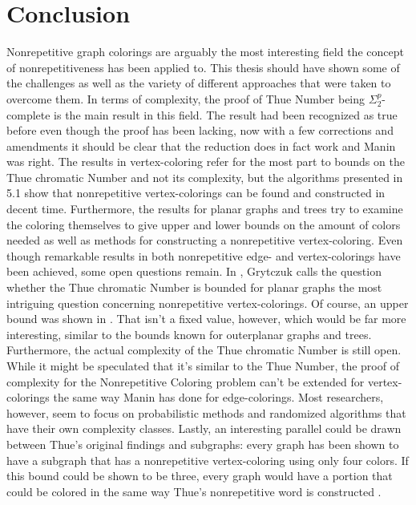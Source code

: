 \documentclass[12pt,a4paper]{article}
\begin{document}
\newpage
\section{Conclusion}
Nonrepetitive graph colorings are arguably the most interesting field the concept of nonrepetitiveness has been applied to. This thesis should have shown some of the challenges as well as the variety of different approaches that were taken to overcome them. 
\newline 
In terms of complexity, the proof of Thue Number being $\Sigma^p_2$-complete is the main result in this field. The result had been recognized as true before even though the proof has been lacking, now with a few corrections and amendments it should be clear that the reduction does in fact work and Manin was right. The results in vertex-coloring refer for the most part to bounds on the Thue chromatic Number and not its complexity, but the algorithms presented in 5.1 show that nonrepetitive vertex-colorings can be found and constructed in decent time. Furthermore, the results for planar graphs and trees try to examine the coloring themselves to give upper and lower bounds on the amount of colors needed as well as methods for constructing a nonrepetitive vertex-coloring.
\newline
Even though remarkable results in both nonrepetitive edge- and vertex-colorings have been achieved, some open questions remain.
\newline
In \citep{Grytczuk2007}, Grytczuk calls the question whether the Thue chromatic Number is bounded for planar graphs the most intriguing question concerning nonrepetitive vertex-colorings. Of course, an upper bound was shown in \citep{Dujmovic2012}. That isn't a fixed value, however, which would be far more interesting, similar to the bounds known for outerplanar graphs and trees.
\newline
Furthermore, the actual complexity of the Thue chromatic Number is still open. While it might be speculated that it's similar to the Thue Number, the proof of complexity for the Nonrepetitive Coloring problem can't be extended for vertex-colorings the same way Manin has done for edge-colorings. Most researchers, however, seem to focus on probabilistic methods and randomized algorithms that have their own complexity classes.
\newline
Lastly, an interesting parallel could be drawn between Thue's original findings and subgraphs: every graph has been shown to have a subgraph that has a nonrepetitive vertex-coloring using only four colors. If this bound could be shown to be three, every graph would have a portion that could be colored in the same way Thue's nonrepetitive word is constructed \citep{Barat2008}.
\end{document}
